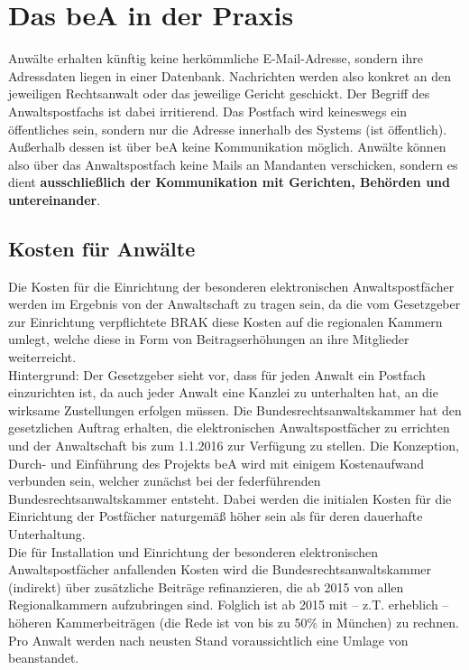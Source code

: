 \section{Das beA in der Praxis}
Anwälte erhalten künftig keine herkömmliche E-Mail-Adresse, sondern ihre Adressdaten liegen in einer Datenbank. Nachrichten werden also konkret an den jeweiligen Rechtsanwalt oder das jeweilige Gericht geschickt.
Der Begriff des Anwaltspostfachs ist dabei irritierend. Das Postfach wird keineswegs ein öffentliches sein, sondern nur die Adresse innerhalb des Systems (ist öffentlich). Außerhalb dessen ist über beA keine Kommunikation möglich. Anwälte können also über das Anwaltspostfach keine Mails an Mandanten verschicken, sondern es dient \textbf{ausschließlich der Kommunikation mit Gerichten, Behörden und untereinander}.

\subsection{Kosten für Anwälte}
Die Kosten für die Einrichtung der besonderen elektronischen Anwaltspostfächer werden im Ergebnis von der Anwaltschaft zu tragen sein, da die vom Gesetzgeber zur Einrichtung verpflichtete BRAK diese Kosten auf die regionalen Kammern umlegt, welche diese in Form von Beitragserhöhungen an ihre Mitglieder weiterreicht. \\
Hintergrund: Der Gesetzgeber sieht vor, dass für jeden Anwalt ein Postfach einzurichten ist, da auch jeder Anwalt eine Kanzlei zu unterhalten hat, an die wirksame Zustellungen erfolgen müssen. Die Bundesrechtsanwaltskammer hat den gesetzlichen Auftrag erhalten, die elektronischen Anwaltspostfächer zu errichten und der Anwaltschaft bis zum 1.1.2016 zur Verfügung zu stellen. Die Konzeption, Durch- und Einführung des Projekts beA  wird mit einigem Kostenaufwand verbunden sein, welcher zunächst bei der federführenden Bundesrechtsanwaltskammer entsteht. Dabei werden die initialen Kosten für die Einrichtung der Postfächer naturgemäß höher sein als für deren dauerhafte Unterhaltung. \\
Die für Installation und Einrichtung der besonderen elektronischen Anwaltspostfächer anfallenden Kosten wird die Bundesrechtsanwaltskammer (indirekt) über zusätzliche Beiträge refinanzieren, die ab 2015 von allen Regionalkammern aufzubringen sind. Folglich ist ab 2015 mit  – z.T. erheblich – höheren Kammerbeiträgen (die Rede ist von bis zu 50\% in München) zu rechnen.
Pro Anwalt werden nach neusten Stand voraussichtlich eine Umlage von  beanstandet.


